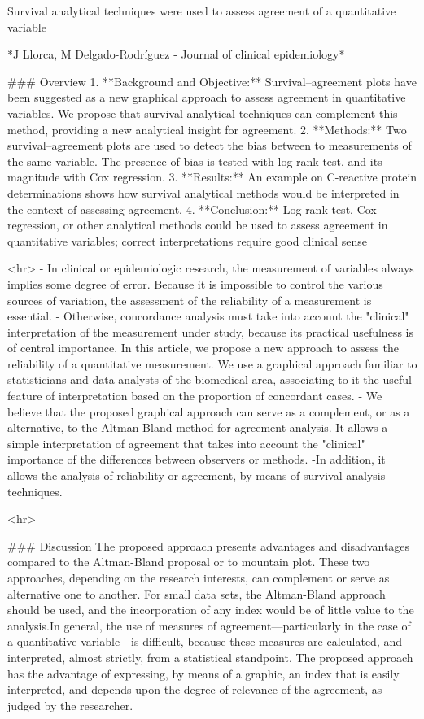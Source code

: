 Survival analytical techniques were used to assess agreement of a quantitative variable

*J Llorca, M Delgado-Rodríguez - Journal of clinical epidemiology*

### Overview
1. **Background and Objective:** Survival–agreement plots have been suggested as a new graphical approach to assess agreement in
quantitative variables. We propose that survival analytical techniques can complement this method, providing a new analytical insight
for agreement.
2. **Methods:** Two survival–agreement plots are used to detect the bias between to measurements of the same variable. The presence of
bias is tested with log-rank test, and its magnitude with Cox regression.
3. **Results:** An example on C-reactive protein determinations shows how survival analytical methods would be interpreted in the context
of assessing agreement.
4. **Conclusion:** Log-rank test, Cox regression, or other analytical methods could be used to assess agreement in quantitative variables;
correct interpretations require good clinical sense

<hr>
- In clinical or epidemiologic research, the measurement of variables always implies some degree of error.
Because it is impossible to control the various sources of variation, the assessment of the reliability of a
measurement is essential. 
- Otherwise, concordance analysis must take into account the "clinical" interpretation 
of the measurement under study, because its practical usefulness is of central importance. In this article, 
we propose a new approach to assess the reliability of a quantitative measurement. We use a graphical approach 
familiar to statisticians and data analysts of the biomedical area, associating to it the useful feature of 
interpretation based on the proportion of concordant cases. 
- We believe that the proposed graphical approach 
can serve as a complement, or as a alternative, to the Altman-Bland method for agreement analysis. It allows
a simple interpretation of agreement that takes into account the "clinical" importance of the differences 
between observers or methods. 
-In addition, it allows the analysis of reliability or agreement, by means of survival analysis techniques.

<hr>

### Discussion
The proposed approach presents advantages and disadvantages compared to the Altman-Bland proposal or to
mountain plot. These two approaches, depending on the research interests, can complement or serve as alternative
one to another. For small data sets, the Altman-Bland approach should be used, and the incorporation of any index
would be of little value to the analysis.In general, the use of measures of agreement—particularly
in the case of a quantitative variable—is difficult, because these measures are calculated, and interpreted, almost
strictly, from a statistical standpoint. The proposed approach has the advantage of expressing, by means of a graphic, an
index that is easily interpreted, and depends upon the degree of relevance of the agreement, as judged by the researcher.


